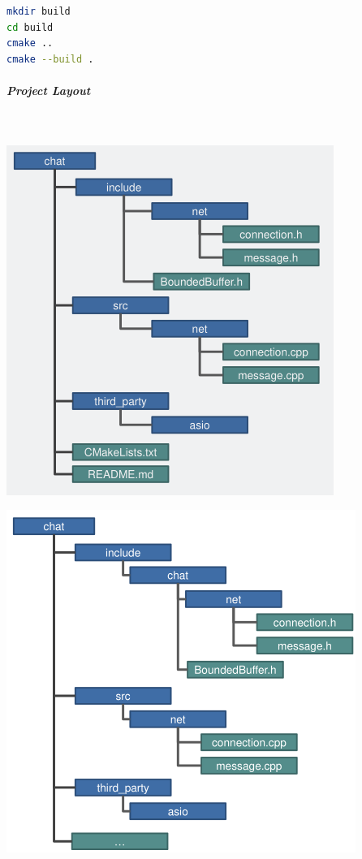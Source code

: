 \documentclass[11pt,twoside,landscape]{article}
\begin{document}
\begin{multicols}{2}
\begin{lstlisting}[language=sh,label=lst:build-cmake-project,caption={Build cmake project},captionpos=b,numbers=none]
mkdir build
cd build
cmake ..
cmake --build .
\end{lstlisting}

\subparagraph{Project Layout} \
\label{sec:org90a480f}
{
\begin{center}
\includegraphics[width=.9\linewidth]{img/cpp_project_layout_app.png}
\end{center}
\label{fig:recomended-project-layout-for-an-application}
}


{
\begin{center}
\includegraphics[width=.9\linewidth]{img/cpp_project_layout_library.png}
\end{center}
\label{fig:recomended-project-layout-for-a-library}
}

\end{multicols}
\end{document}
